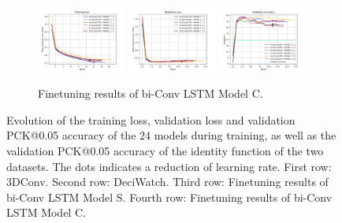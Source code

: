 \documentclass[./main.tex]{subfiles}
\begin{document}
\begin{figure}[htbp]
    \begin{subfigure}[b]{\textwidth}
        \centering
        \includegraphics[width=0.32\textwidth]{./entities/finetuned/unipose2/train_losses.png}
        \includegraphics[width=0.32\textwidth]{./entities/finetuned/unipose2/val_losses.png}
        \includegraphics[width=0.32\textwidth]{./entities/finetuned/unipose2/val_accs.png}
        \caption{Finetuning results of bi-Conv LSTM Model C.}
    \end{subfigure}
    \hfill
    
    \caption{Evolution of the training loss, validation loss and validation PCK@0.05 accuracy of the 24 models during training, as well as the validation PCK@0.05 accuracy of the identity function of the two datasets. The dots indicates a reduction of learning rate. First row: 3DConv. Second row: DeciWatch. Third row: Finetuning results of bi-Conv LSTM Model S. Fourth row: Finetuning results of bi-Conv LSTM Model C.}
    \label{fig:finetune_res}
\end{figure}
\end{document}
